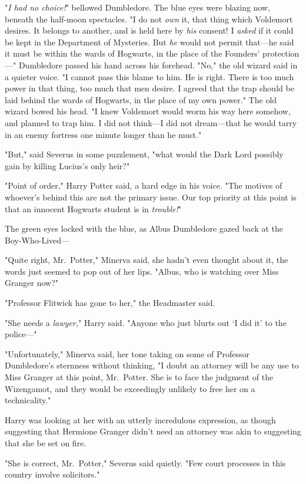 "\emph{I had no choice!}" bellowed Dumbledore. The blue eyes were blazing now,
beneath the half-moon spectacles. "I do not \emph{own} it, that thing which
Voldemort desires. It belongs to another, and is held here by \emph{his}
consent! I \emph{asked} if it could be kept in the Department of Mysteries. But
\emph{he} would not permit that---he said it must be within the wards of
Hogwarts, in the place of the Founders' protection---" Dumbledore passed his
hand across his forehead. "No," the old wizard said in a quieter voice. "I
cannot pass this blame to him. He is right. There is too much power in that
thing, too much that men desire. I agreed that the trap should be laid behind
the wards of Hogwarts, in the place of my own power." The old wizard bowed his
head. "I knew Voldemort would worm his way here somehow, and planned to trap
him. I did not think---I did not dream---that he would tarry in an enemy
fortress one minute longer than he must."

"But," said Severus in some puzzlement, "what would the Dark Lord possibly gain
by killing Lucius's only heir?"

"Point of order," Harry Potter said, a hard edge in his voice. "The motives of
whoever's behind this are not the primary issue. Our top priority at this point
is that an innocent Hogwarts student is in \emph{trouble!}"

The green eyes locked with the blue, as Albus Dumbledore gazed back at the
Boy-Who-Lived---

"Quite right, Mr.~Potter," Minerva said, she hadn't even thought about it, the
words just seemed to pop out of her lips. "Albus, who is watching over Miss
Granger now?"

"Professor Flitwick has gone to her," the Headmaster said.

"She needs a \emph{lawyer,}" Harry said. "Anyone who just blurts out `I did it'
to the police---"

"Unfortunately," Minerva said, her tone taking on some of Professor
Dumbledore's sternness without thinking, "I doubt an attorney will be any use
to Miss Granger at this point, Mr.~Potter. She is to face the judgment of the
Wizengamot, and they would be exceedingly unlikely to free her on a
technicality."

Harry was looking at her with an utterly incredulous expression, as though
suggesting that Hermione Granger didn't need an attorney was akin to suggesting
that she be set on fire.

"She is correct, Mr.~Potter," Severus said quietly. "Few court processes in
this country involve solicitors."

